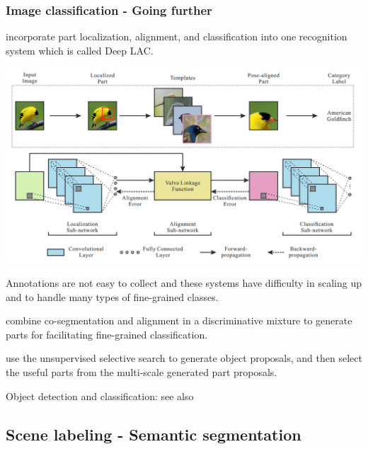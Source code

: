 \begin{frame}[allowframebreaks]
\frametitle{Image classification - Going further}


\cite{lin2015deep} incorporate part localization, alignment, and classification into one recognition system which is called Deep LAC. 

\begin{center}
	\includegraphics[scale=0.5]{figs/Deep_LAC_structure}
\end{center}


\framebreak

Annotations are not easy to collect and these systems have difficulty in scaling up and to handle many types of fine-grained classes.

\bigskip 

 combine co-segmentation and alignment in a discriminative mixture to generate parts for facilitating fine-grained classification. 

\bigskip

 use the unsupervised selective search to generate object proposals, and then select the useful parts from the multi-scale generated part proposals.

\bigskip 

Object detection and classification: see also  
\end{frame}



\subsection{Scene labeling - Semantic segmentation}

